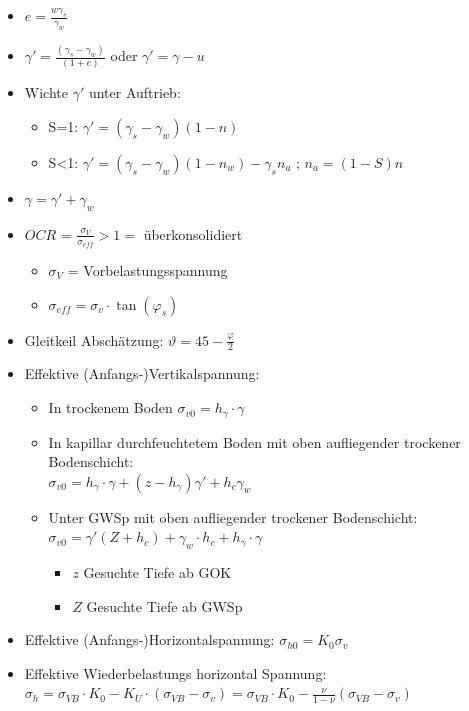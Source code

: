 \documentclass[fleqn,twoside]{article}
\begin{document}
\begin{itemize}
	\item $e=\frac{w \gamma_s}{\gamma_w}$
	\item $\gamma' = \frac{(\gamma_s-\gamma_w)}{(1+e)}$ oder $\gamma' = \gamma - u$
	\item Wichte $\gamma'$ unter Auftrieb:
	\begin{itemize}
		\item  S=1: $\gamma' = (\gamma_s - \gamma_w)(1-n)$
		\item  S<1: $\gamma' = (\gamma_s - \gamma_w)(1-n_w) - \gamma_s n_a$ ; $n_a = (1-S)n$
	\end{itemize}	 
		
	\item $\gamma = \gamma'+\gamma_w$
	\item $OCR$ = $\frac{\sigma_V}{ \sigma_{eff}} > 1 =$ überkonsolidiert 
	\begin{itemize}
		\item $\sigma_V$ = Vorbelastungsspannung 
		\item $\sigma_{eff}=\sigma_v \cdot \tan(\varphi_s)$
	\end{itemize}
	\item Gleitkeil Abschätzung: $\vartheta = 45 - \frac{\varphi}{2}$
	\item Effektive (Anfangs-)Vertikalspannung:
	\begin{itemize}
		\item In trockenem Boden $\sigma_{v0}=h_{\gamma}\cdot \gamma$
		\item In kapillar durchfeuchtetem Boden mit oben aufliegender trockener Bodenschicht:\\ $\sigma_{v0} = h_{\gamma} \cdot \gamma + (z-h_{\gamma})\gamma'+ h_c \gamma_w $
		\item Unter GWSp mit oben aufliegender trockener Bodenschicht: $\sigma_{v0} = \gamma'(Z+h_c)+\gamma_w\cdot h_c+h_{\gamma}\cdot\gamma	$
		\begin{itemize}
			\item $z$ Gesuchte Tiefe ab GOK
			\item $Z$ Gesuchte Tiefe ab GWSp
		\end{itemize}
	\end{itemize}
	\item Effektive (Anfangs-)Horizontalspannung: $\sigma_{h0} = K_0 \sigma_v$
	\item Effektive Wiederbelastungs horizontal Spannung: $\sigma_h=\sigma_{VB}\cdot K_0-K_U\cdot (\sigma_{VB}-\sigma_v)=\sigma_{VB}\cdot K_0-\frac{\nu}{1-\nu}(\sigma_{VB}-\sigma_v)$

\end{itemize}
\end{document}
